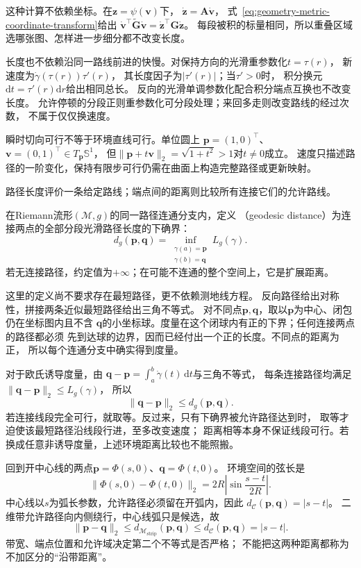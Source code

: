 这种计算不依赖坐标。在$\bm z=\psi(\bm v)$下，
$\dot{\bm z}=\bm A\dot{\bm v}$，
式~\eqref{eq:geometry-metric-coordinate-transform}给出
$\dot{\bm v}^\top\widetilde{\bm G}\dot{\bm v}
=\dot{\bm z}^\top\bm G\dot{\bm z}$。
每段被积的标量相同，所以重叠区域选哪张图、怎样进一步细分都不改变长度。

长度也不依赖沿同一路线前进的快慢。对保持方向的光滑重参数化$t=\tau(r)$，
新速度为$\dot\gamma(\tau(r))\tau'(r)$，
其长度因子为$|\tau'(r)|$；当$\tau'>0$时，
积分换元$\mathrm dt=\tau'(r)\mathrm dr$给出相同总长。
反向的光滑单调参数化配合积分端点互换也不改变长度。
允许停顿的分段正则重参数化可分段处理；来回多走则改变路线的经过次数，
不属于仅仅换速度。

瞬时切向可行不等于环境直线可行。单位圆上
$\bm p=(1,0)^\top$、$\bm v=(0,1)^\top\in T_{\bm p}\mathbb S^1$，
但$\lVert\bm p+t\bm v\rVert_2=\sqrt{1+t^2}>1$对$t\neq0$成立。
速度只描述路径的一阶变化，保持有限步可行仍需在曲面上构造完整路径或更新映射。


路径长度评价一条给定路线；端点间的距离则比较所有连接它们的允许路线。

\begin{definition}[测地距离]
\label{def:geometry-geodesic-distance}
在Riemann流形$(\mathcal M,g)$的同一路径连通分支内，定义
（geodesic distance）为连接两点的全部分段光滑路径长度的下确界：
\begin{equation}
 d_g(\bm p,\bm q)=
 \inf_{\substack{\gamma(a)=\bm p\\\gamma(b)=\bm q}}L_g(\gamma).
 \label{eq:geometry-geodesic-distance}
\end{equation}
若无连接路径，约定值为$+\infty$；在可能不连通的整个空间上，它是扩展距离。
\end{definition}
这里的定义尚不要求存在最短路径，更不依赖测地线方程。
反向路径给出对称性，拼接两条近似最短路径给出三角不等式。
对不同点$\bm p,\bm q$，取以$\bm p$为中心、闭包仍在坐标图内且不含
$\bm q$的小坐标球。度量在这个闭球内有正的下界；任何连接两点的路径都必须
先到达球的边界，因而已经付出一个正的长度。不同点的距离为正，
所以每个连通分支中确实得到度量。

对于欧氏诱导度量，由
$\bm q-\bm p=\int_a^b\dot\gamma(t)\,\mathrm dt$与三角不等式，
每条连接路径均满足$\lVert\bm q-\bm p\rVert_2\leq L_g(\gamma)$，
所以
\[
 \lVert\bm q-\bm p\rVert_2\leq d_g(\bm p,\bm q).
\]
若连接线段完全可行，就取等。反过来，只有下确界被允许路径达到时，
取等才迫使该最短路径沿线段行进，至多改变速度；
距离相等本身不保证线段可行。若换成任意非诱导度量，上述环境距离比较也不能照搬。

回到开中心线的两点$\bm p=\Phi(s,0)$、$\bm q=\Phi(t,0)$。
环境空间的弦长是
\begin{equation}
 \lVert\Phi(s,0)-\Phi(t,0)\rVert_2
 =2R\left|\sin\frac{s-t}{2R}\right|.
 \label{eq:geometry-strip-chord-distance}
\end{equation}
中心线以$s$为弧长参数，允许路径必须留在开弧内，因此
$d_{\mathcal C}(\bm p,\bm q)=|s-t|$。
二维带允许路径向内侧绕行，中心线弧只是候选，故
\[
 \lVert\bm p-\bm q\rVert_2
 \leq d_{\mathcal M_{\mathrm{strip}}}(\bm p,\bm q)
 \leq d_{\mathcal C}(\bm p,\bm q)=|s-t|.
\]
带宽、端点位置和允许域决定第二个不等式是否严格；
不能把这两种距离都称为不加区分的“沿带距离”。


